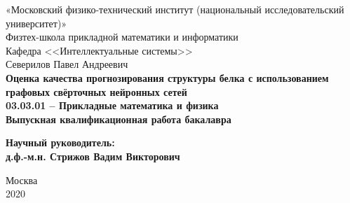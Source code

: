 \documentclass[14pt]{extarticle}
\begin{document}
\thispagestyle{empty}
\begin{center}
    \sc
        «Московский физико-технический институт \rm{(национальный исследовательский университет)}»\\
        Физтех-школа прикладной математики и информатики\\
        Кафедра <<Интеллектуальные системы>>
        \\[35mm]
    \rm\large
        Северилов Павел Андреевич\\[10mm]
    \bf\Large
		Оценка качества прогнозирования структуры белка с использованием графовых свёрточных нейронных сетей\\[10mm]
    \rm\normalsize
        03.03.01 -- Прикладные математика и физика\\[10mm]
    \sc
        Выпускная квалификационная работа бакалавра\\[10mm]
\end{center}
\hfill\parbox{85mm}{
    \begin{flushleft}
    \bf
        Научный руководитель:\\
    \rm
        д.ф.-м.н. Стрижов Вадим Викторович\\[3.9cm]
    \end{flushleft}
}
\begin{center}
    Москва\\
    2020
\end{center}


\newpage
\tableofcontents
\newpage
\end{document}
